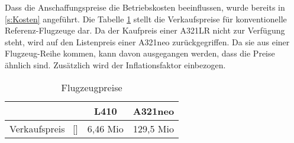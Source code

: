 Dass die Anschaffungspreise die Betriebskosten beeinflussen, 
wurde bereits in \ref{s:Kosten} angeführt. 
Die Tabelle \ref{Flugzeugpreise} stellt die Verkaufspreise 
für konventionelle Referenz-Flugzeuge dar.
Da der Kaufpreis einer A321LR nicht zur Verfügung steht, 
wird auf den Listenpreis einer A321neo zurückgegriffen. 
Da sie aus einer Flugzeug-Reihe kommen, kann davon ausgegangen werden, 
dass die Preise ähnlich sind. Zusätzlich wird der Inflationsfaktor einbezogen. %

\begin{table}[h]
	\begin{center}
    \caption{Flugzeugpreise}
	\label{Flugzeugpreise}
	\begin{tabular}{|l|c|c|}
		\hline
		 & \textbf{L410} & \textbf{A321neo}  \\ \hline
		 Verkaufspreis ~[\text{EUR}] & 6,46 Mio \cite{marksel2023comparative} & 129,5 Mio \cite{aerotelegraph_airbus} \\ \hline
	\end{tabular}
    \end{center}
\end{table}

